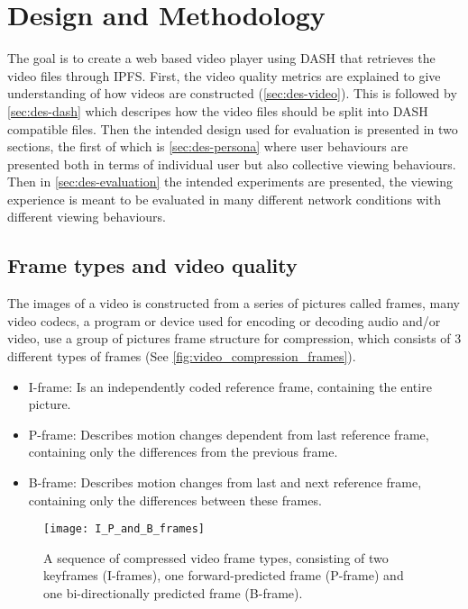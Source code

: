 \chapter{Design and Methodology}
\label{cha:design-and-method}

The goal is to create a web based video player using \ac{DASH} that retrieves the video files through \ac{IPFS}. First, the video quality metrics are explained to give understanding of how videos are constructed (\autoref{sec:des-video}). This is followed by \autoref{sec:des-dash} which descripes how the video files should be split into \ac{DASH} compatible files. Then the intended design used for evaluation is presented in two sections, the first of which is \autoref{sec:des-persona} where user behaviours are presented both in terms of individual user but also collective viewing behaviours. Then in \autoref{sec:des-evaluation} the intended experiments are presented, the viewing experience is meant to be evaluated in many different network conditions with different viewing behaviours.

\section{Frame types and video quality}
\label{sec:des-video}
The images of a video is constructed from a series of pictures called frames, many video codecs, a program or device used for encoding or decoding audio and/or video, use a group of pictures frame structure for compression, which consists of 3 different types of frames (See \autoref{fig:video_compression_frames}).

\begin{itemize}
    \item \ac{I-frame}: Is an independently coded reference frame, containing the entire picture.
    \item \ac{P-frame}: Describes motion changes dependent from last reference frame, containing only the differences from the previous frame.
    \item \ac{B-frame}: Describes motion changes from last and next reference frame, containing only the differences between these frames.
\end{itemize}

\begin{figure}
    \myfloatalign
    \texttt{[image: I\_P\_and\_B\_frames]}
    \caption[Frame types used in video compression]{A sequence of compressed video frame types, consisting of two keyframes (\acsp{I-frame}), one forward-predicted frame (\acs{P-frame}) and one bi-directionally predicted frame (\acs{B-frame}).}
    \label{fig:video_compression_frames}
\end{figure}

